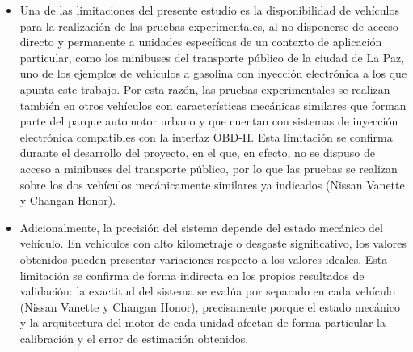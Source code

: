 \begin{itemize}
	\item Una de las limitaciones del presente estudio es la disponibilidad de
	vehículos para la realización de las pruebas experimentales, al no disponerse
	de acceso directo y permanente a unidades específicas de un contexto de aplicación particular, como los minibuses del transporte público de la ciudad de La Paz, uno de los ejemplos de vehículos a gasolina con inyección electrónica a los que apunta este trabajo. Por esta razón, las pruebas experimentales se realizan también en otros vehículos con características mecánicas
	similares que forman parte del parque automotor urbano y que
	cuentan con sistemas de inyección electrónica compatibles con la
	interfaz OBD-II. Esta limitación se confirma durante el desarrollo del proyecto, en el que, en efecto, no se dispuso de acceso a minibuses del transporte público, por lo que las pruebas se realizan sobre los dos vehículos mecánicamente similares ya indicados (Nissan Vanette y Changan Honor).
	\item Adicionalmente, la precisión del sistema depende del estado mecánico del vehículo. En vehículos con alto kilometraje o desgaste significativo, los valores obtenidos pueden presentar variaciones respecto a los valores ideales. Esta limitación se confirma de forma indirecta en los propios resultados de validación: la exactitud del sistema se evalúa por separado en cada vehículo (Nissan Vanette y Changan Honor), precisamente porque el estado mecánico y la arquitectura del motor de cada unidad afectan de forma particular la calibración y el error de estimación obtenidos.
\end{itemize}
\clearpage